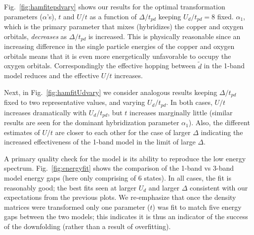Fig.~\ref{fig:hamfitepdvary} shows our results for the optimal 
transformation parameters ($\alpha$'s), $t$ and $U/t$ as a function of $\Delta/t_{pd}$
keeping $U_d/t_{pd}=8$ fixed. $\alpha_1$, which is the primary parameter that mixes (hybridizes) 
the copper and oxygen orbitals, \textit{decreases} as $\Delta/t_{pd}$ is increased. 
This is physically reasonable since an increasing difference in the single particle energies of the copper and oxygen orbitals 
means that it is even more energetically unfavorable to occupy the oxygen orbitals. 
Correspondingly the effective hopping between $\tilde{d}$ in the 
1-band model reduces and the effective $U/t$ increases. 

Next, in Fig.~\ref{fig:hamfitUdvary} we consider analogous results keeping $\Delta/t_{pd}$ fixed to two representative values, 
and varying $U_d/t_{pd}$. In both cases, $U/t$ increases dramatically with $U_d/t_{pd}$, but $t$ 
increases marginally little (similar results are seen for the dominant 
hybridization parameter $\alpha_1$). Also, the different estimates of $U/t$ are closer to each other 
for the case of larger $\Delta$ indicating the increased effectiveness of the 1-band model 
in the limit of large $\Delta$. 

A primary quality check for the model is its ability to reproduce the low energy spectrum. 
Fig.~\ref{fig:energyfit} shows the comparison of the 1-band vs 3-band model energy gaps 
(here only comprising of $6$ states). In all cases, the fit is reasonably good; 
the best fits seen at larger $U_d$ and larger $\Delta$ consistent with our expectations 
from the previous plots. We re-emphasize that once the density matrices were transformed 
only one parameter ($t$) was fit to match five energy gaps between the two models; this indicates 
it is thus an indicator of the success of the downfolding (rather than a result of overfitting). 

